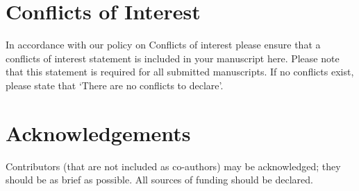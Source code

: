 \section{Conflicts of Interest}
\label{sec:conflicts_of_interest}

In accordance with our policy on Conflicts of interest please ensure that a conflicts of interest statement is included in your manuscript here.  Please note that this statement is required for all submitted manuscripts.  If no conflicts exist, please state that ‘There are no conflicts to declare’.

\section{Acknowledgements}
\label{sec:acknowledgements}

Contributors (that are not included as co-authors) may be acknowledged; they should be as brief as possible. All sources of funding should be declared.
